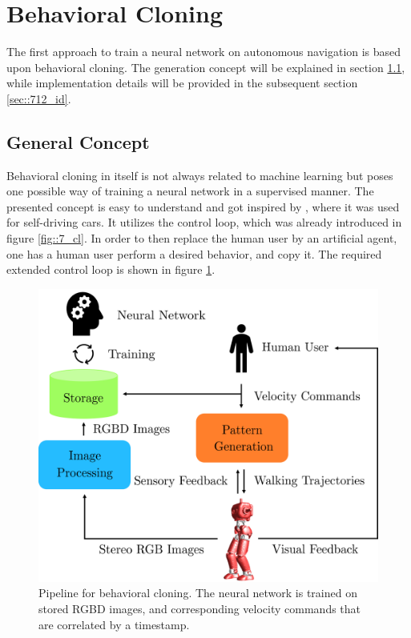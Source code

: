 \FloatBarrier
\section{Behavioral Cloning}
\label{sec::71_bc}
The first approach to train a neural network on autonomous navigation is based upon behavioral cloning. The generation concept will be explained in section \ref{sec::711_gc}, while implementation details will be provided in the subsequent section \ref{sec::712_id}.
\FloatBarrier
\subsection{General Concept}
\label{sec::711_gc}
Behavioral cloning in itself is not always related to machine learning but poses one possible way of training a neural network in a supervised manner. The presented concept is easy to understand and got inspired by \cite{bojarski2016end}, where it was used for self-driving cars. It utilizes the control loop, which was already introduced in figure \ref{fig::7_cl}. In order to then replace the human user by an artificial agent, one has a human user perform a desired behavior, and copy it. The required extended control loop is shown in figure \ref{fig::71_bc}.
\begin{figure}[h!]
	\centering
	\includegraphics[scale=.5]{chapters/07_autonomous_high_level_control_of_the_walking_pattern_generator/img/behavioral_cloning.png}
	\caption{Pipeline for behavioral cloning. The neural network is trained on stored RGBD images, and corresponding velocity commands that are correlated by a timestamp.}
	\label{fig::71_bc}
\end{figure}
